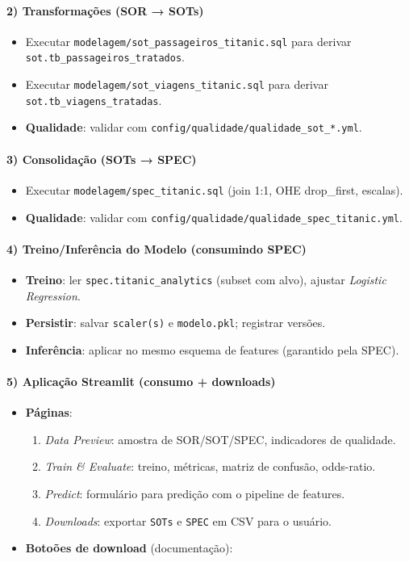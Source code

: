 \documentclass[12pt,a4paper]{article}
\begin{document}
\paragraph{2) Transformações (SOR → SOTs)}
\begin{itemize}
  \item Executar \texttt{modelagem/sot\_passageiros\_titanic.sql} para derivar \texttt{sot.tb\_passageiros\_tratados}.
  \item Executar \texttt{modelagem/sot\_viagens\_titanic.sql} para derivar \texttt{sot.tb\_viagens\_tratadas}.
  \item \textbf{Qualidade}: validar com \texttt{config/qualidade/qualidade\_sot\_*.yml}.
\end{itemize}

\paragraph{3) Consolidação (SOTs → SPEC)}
\begin{itemize}
  \item Executar \texttt{modelagem/spec\_titanic.sql} (join 1:1, OHE drop\_first, escalas).
  \item \textbf{Qualidade}: validar com \texttt{config/qualidade/qualidade\_spec\_titanic.yml}.
\end{itemize}

\paragraph{4) Treino/Inferência do Modelo (consumindo SPEC)}
\begin{itemize}
  \item \textbf{Treino}: ler \texttt{spec.titanic\_analytics} (subset com alvo), ajustar \textit{Logistic Regression}.
  \item \textbf{Persistir}: salvar \texttt{scaler(s)} e \texttt{modelo.pkl}; registrar versões.
  \item \textbf{Inferência}: aplicar no mesmo esquema de features (garantido pela SPEC).
\end{itemize}

\paragraph{5) Aplicação Streamlit (consumo + downloads)}
\begin{itemize}
  \item \textbf{Páginas}: 
    \begin{enumerate}
      \item \textit{Data Preview}: amostra de SOR/SOT/SPEC, indicadores de qualidade.
      \item \textit{Train \& Evaluate}: treino, métricas, matriz de confusão, odds-ratio.
      \item \textit{Predict}: formulário para predição com o pipeline de features.
      \item \textit{Downloads}: exportar \texttt{SOTs} e \texttt{SPEC} em CSV para o usuário.
    \end{enumerate}
  \item \textbf{Botoões de download} (documentação):
\end{itemize}
\end{document}
